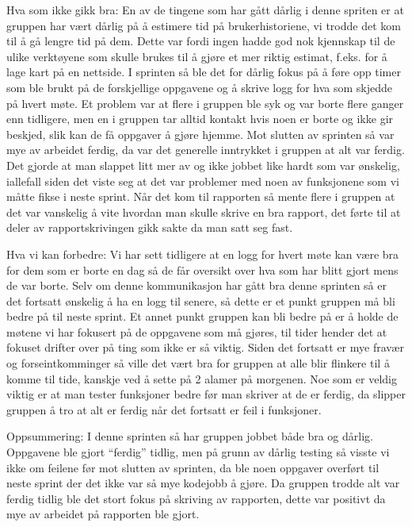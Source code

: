 \documentclass[12pt,a4paper,norsk]{article}
\begin{document}
Hva som ikke gikk bra:
En av de tingene som har gått dårlig i denne spriten er at gruppen har vært dårlig på å estimere tid på brukerhistoriene, vi trodde det kom til å gå lengre tid på dem. Dette var fordi ingen hadde god nok kjennskap til de ulike verktøyene som skulle brukes til å gjøre et mer riktig estimat, f.eks. for å lage kart på en nettside.
I sprinten så ble det for dårlig fokus på å føre opp timer som ble brukt på de forskjellige oppgavene og å skrive logg for hva som skjedde på hvert møte. 
Et problem var at flere i gruppen ble syk og var borte flere ganger enn tidligere, men en i gruppen tar alltid kontakt hvis noen er borte og ikke gir beskjed, slik kan de få oppgaver å gjøre hjemme. 
Mot slutten av sprinten så var mye av arbeidet ferdig, da var det generelle inntrykket i gruppen at alt var ferdig. Det gjorde at man slappet litt mer av og ikke jobbet like hardt som var ønskelig, iallefall siden det viste seg at det var problemer med noen av funksjonene som vi måtte fikse i neste sprint. 
Når det kom til rapporten så mente flere i gruppen at det var vanskelig å vite hvordan man skulle skrive en bra rapport, det førte til at deler av rapportskrivingen gikk sakte da man satt seg fast.

Hva vi kan forbedre:
Vi har sett tidligere at en logg for hvert møte kan være bra for dem som er borte en dag så de får oversikt over hva som har blitt gjort mens de var borte. Selv om denne kommunikasjon har gått bra denne sprinten så er det fortsatt ønskelig å ha en logg til senere, så dette er et punkt gruppen må bli bedre på til neste sprint. 
Et annet punkt gruppen kan bli bedre på er å holde de møtene vi har fokusert på de oppgavene som må gjøres, til tider hender det at fokuset drifter over på ting som ikke er så viktig. Siden det fortsatt er mye fravær og forseintkomminger så ville det vært bra for gruppen at alle blir flinkere til å komme til tide, kanskje ved å sette på 2 alamer på morgenen.   
Noe som er veldig viktig er at man tester funksjoner bedre før man skriver at de er ferdig, da slipper gruppen å tro at alt er ferdig når det fortsatt er feil i funksjoner. 

Oppsummering:
I denne sprinten så har gruppen jobbet både bra og dårlig. Oppgavene ble gjort “ferdig” tidlig, men på grunn av dårlig testing så visste vi ikke om feilene før mot slutten av sprinten, da ble noen oppgaver overført til neste sprint der det ikke var så mye kodejobb å gjøre. Da gruppen trodde alt var ferdig tidlig ble det stort fokus på skriving av rapporten, dette var positivt da mye av arbeidet på rapporten ble gjort.
\end{document}
